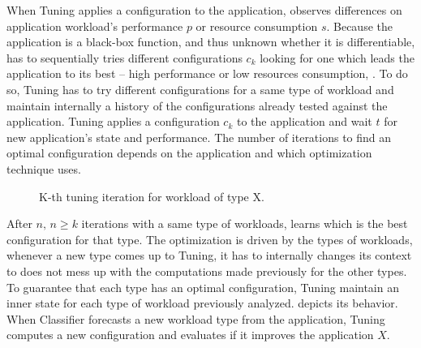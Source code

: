 When Tuning applies a configuration to the application, \name observes differences on application workload's
performance $p$ or resource consumption $s$. Because the application is a black-box function, and thus unknown whether
it is differentiable, \name has to sequentially tries different configurations $c_k$ looking for one which leads the
application to its best -- high performance or low resources consumption, . To do so, Tuning
has to try different configurations for a same type of workload and maintain internally a history of the configurations
already tested against the application.  Tuning applies a configuration $c_k$ to the application and wait $t$ for new
application's state and performance. The number of iterations to find an optimal configuration depends on the
application and which optimization technique \name uses.

\begin{figure*}[htp]
    \centering
    \def\svgwidth{\textwidth}
    \scalebox{1.0}{}
    \caption{K-th tuning iteration for workload of type X.}
    \label{fig:tuning-overview}
\end{figure*}

After $n,\, n \geq k$ iterations with a same type of workloads, \name learns which is the best configuration for that
type. The optimization is driven by the types of workloads, whenever a new type comes up to Tuning, it has to
internally changes its context to does not mess up with the computations made previously for the other types.  To
guarantee that each type has an optimal configuration, Tuning maintain an inner state for each type of workload
previously analyzed.  depicts its behavior. When Classifier forecasts a new workload type from
the application, Tuning computes a new configuration and evaluates if it improves the application $X$.

